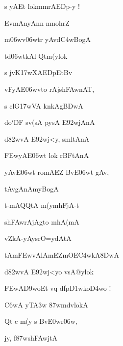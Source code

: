 \dnnemslokac 
{\dn s yAEt lokmmrAEDp-y {\rs !\re}}
\dontdisplaylinenum

\dnnemslokad 
{\dn EvmAnyAn\?n mnohr\?Z \vegdn\dontdisplaylinenum}


\ujvers\dnnemsloka 
{\dn m\306wv\306wtr\2 yAvd\3C4wBogA}
\dontdisplaylinenum

\dnnemslokab 
{\dn td\306wtkAl\? Qtm(y\0lok\? \dandadn\dontdisplaylinenum}

\dnnemslokac 
{\dn s jvK\317wXAEDpEtB\0v\?}
\dontdisplaylinenum

\dnnemslokad 
{\dn vFyA\0E\306wvto rAjsh\3FAwnAT, \vegdn\dontdisplaylinenum}


\ujvers\dnnemsloka 
{\dn s c\4lG\317wVA\2 knkAg\5\3BDwA}
\dontdisplaylinenum

\dnnemslokab 
{\dn do`DF{\qva} sv(sA\2 pysA\2 E\392wjAnA \dandadn\dontdisplaylinenum}

\dnnemslokac 
{\dn d\382wvA E\392wj\?<y, smltAnA}
\dontdisplaylinenum

\dnnemslokad 
{\dn \3FEwyAE\306wt lok\2 rBFtAnA \vegdn\dontdisplaylinenum}


\ujvers\dnnemsloka 
{\dn yAvE\306wt romAEZ BvE\306wt gAv,}
\dontdisplaylinenum

\dnnemslokab 
{\dn tAvgAnAmyBogA \dandadn\dontdisplaylinenum}

\dnnemslokac 
{\dn t-mAQQtA m(y\0mhFjA-t\?}
\dontdisplaylinenum

\dnnemslokad 
{\dn sh\3FAwrAjAgto mhA(mA \vegdn\dontdisplaylinenum}


\ujvers\dnnemsloka 
{\dn {}vZ\0kA\2-yAysrO=ydAtA}
\dontdisplaylinenum

\dnnemslokab 
{\dn tAm\5\3FEwvAlAmEZmOE\3C4wkA\38DwA \dandadn\dontdisplaylinenum}

\dnnemslokac 
{\dn d\382wvA E\392wj\?<yo vsA@ylok\?}
\dontdisplaylinenum

\dnnemslokad 
{\dn \3FEwA\3D9woEt vq{\rdt} dfp\3D1wko\3D4wo {\rs !\re}  \vegdn\dontdisplaylinenum}


\ujvers\dnnemsloka 
{\dn {}\3C6wA yT\?\3A3w\2 \387wmd\?vlokA}
\dontdisplaylinenum

\dnnemslokab 
{\dn Qt\2 c m(y\?{\qvb} s Bv\?\3E0wr\?\306w, \dandadn\dontdisplaylinenum}

\dnnemslokac 
{\dn {}j\0y, f\387wsh\3FAwj\?tA}
\dontdisplaylinenum


